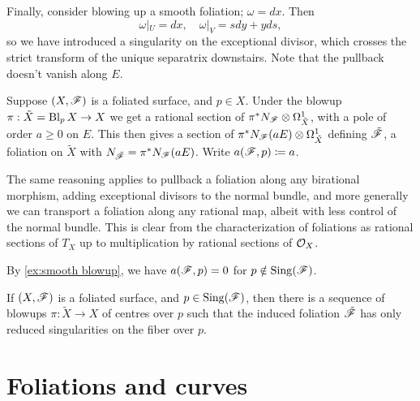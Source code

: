 \begin{example}\label{ex:smooth blowup}
    Finally, consider blowing up a smooth foliation; $\omega=dx$. Then
    \begin{equation*}
        \omega|_U = dx, \quad \omega|_V = sdy+yds,
    \end{equation*}
    so we have introduced a singularity on the exceptional divisor, which
    crosses the strict transform of the unique separatrix downstairs. Note that
    the pullback doesn't vanish along $E$.
\end{example}

\begin{definition}
    Suppose $(X,\mathscr{F})$ is a foliated surface, and $p\in X$. Under the blowup
    $\pi:\tilde X=\operatorname{Bl}_pX\to X$ we get a rational section of
    $\pi^*N_{\mathscr{F}}\otimes\Omega^1_{\tilde X}$, with a pole of order $a\ge0$ on
    $E$. This then gives a section of
    $\pi^*N_{\mathscr{F}}(aE)\otimes\Omega^1_{\tilde X}$ defining $\tilde{\mathscr{F}}$, a
    foliation on $\tilde X$ with $N_{\tilde{\mathscr{F}}}=\pi^*N_{\mathscr{F}}(aE)$. Write
    $a(\mathscr{F},p)\coloneqq a$.
\end{definition}

\begin{remark}
    The same reasoning applies to pullback a foliation along any birational
    morphism, adding exceptional divisors to the normal bundle, and more
    generally we can transport a foliation along any rational map, albeit with
    less control of the normal bundle. This is clear from the characterization
    of foliations as rational sections of $T_X$ up to multiplication by rational
    sections of $\mathcal{O}_X$.
\end{remark}

\begin{remark}
    By \cref{ex:smooth blowup}, we have $a(\mathscr{F},p)=0$ for
    $p\notin\operatorname{Sing}(\mathscr{F})$.
\end{remark}

\begin{theorem}\label{thm:seidenberg}
    If $(X,\mathscr{F})$ is a foliated surface, and $p\in\operatorname{Sing}(\mathscr{F})$, then there is
    a sequence of blowups $\pi:\tilde X\to X$ of centres over $p$ such that the
    induced foliation $\tilde{\mathscr{F}}$ has only reduced singularities on the fiber
    over $p$.
\end{theorem}

\section{Foliations and curves} %

